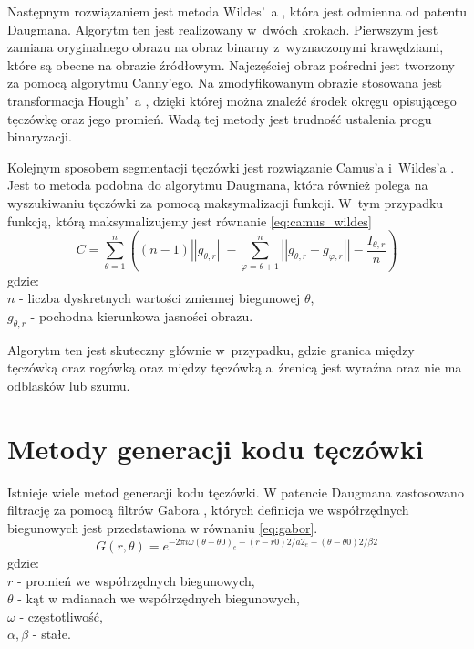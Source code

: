 Następnym rozwiązaniem jest metoda Wildes'~a \cite{Wildes}, która jest odmienna od patentu Daugmana. Algorytm ten jest realizowany w~dwóch krokach. Pierwszym jest zamiana oryginalnego obrazu na obraz binarny z~wyznaczonymi krawędziami, które są obecne na obrazie źródłowym. Najczęściej obraz pośredni jest tworzony za pomocą algorytmu Canny'ego. Na zmodyfikowanym obrazie stosowana jest transformacja Hough'~a \cite{KrH11}, dzięki której można znaleźć środek okręgu opisującego tęczówkę oraz jego promień. Wadą tej metody jest trudność ustalenia progu binaryzacji.

Kolejnym sposobem segmentacji tęczówki jest rozwiązanie Camus'a i~Wildes'a \cite{Camus}. Jest to metoda podobna do algorytmu Daugmana, która również polega na wyszukiwaniu tęczówki za pomocą maksymalizacji funkcji. W~tym przypadku funkcją, którą maksymalizujemy jest równanie \ref{eq:camus_wildes} 
\begin{equation}
\label{eq:camus_wildes}
C=\sum_{\theta =1}^{n} ((n-1)\left|\left| g_{\theta,r} \right|\right| - \sum_{\varphi=\theta + 1 } ^{n} \left| \left| g_{\theta,r} - g_{\varphi,r} \right| \right| - \frac{I_{\theta,r}}{n}  )
\end{equation}
gdzie:\\
$ n $ - liczba dyskretnych wartości zmiennej biegunowej $ \theta $, \\
$ g_{\theta, r} $ - pochodna kierunkowa jasności obrazu.

Algorytm ten jest skuteczny głównie w~przypadku, gdzie granica między tęczówką oraz rogówką oraz między tęczówką a~źrenicą jest wyraźna oraz nie ma odblasków lub szumu.

\section{Metody generacji kodu tęczówki}
\label{sec:metodyGeneracjiKodu}

Istnieje wiele metod generacji kodu tęczówki. W patencie Daugmana zastosowano filtrację za pomocą filtrów Gabora \cite{Daugman}, których definicja we współrzędnych biegunowych jest przedstawiona w równaniu \ref{eq:gabor}.
\begin{equation}
\label{eq:gabor}
G(r,\theta) = e^{-2\pi i\omega (\theta - \theta 0)_{e}-(r - r0)2/a2_{e}-(\theta-\theta 0 )2/\beta 2}
\end{equation}
gdzie:\\
$r$ - promień we współrzędnych biegunowych, \\
$\theta$ - kąt w radianach we współrzędnych biegunowych, \\
$ \omega $ - częstotliwość, \\
$ \alpha, \beta $ - stałe.


